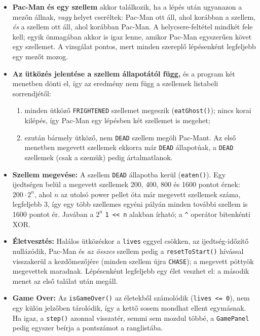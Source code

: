 \documentclass[11pt, a4paper]{article}
\begin{document}
\begin{itemize}
    Az időtartam sosem lesz 0: egy 0 lépéses ijedtség fehérré tenné és megfordítaná a szellemeket, a visszaszámlálás pedig örökre ijedten hagyhatná őket. Egy új power pellet a teljes időtartamot újraindítja.
    \item \textbf{Pac-Man és egy szellem} akkor találkozik, ha a lépés után ugyanazon a mezőn állnak, \textit{vagy} helyet cseréltek: Pac-Man ott áll, ahol korábban a szellem, \textit{és} a szellem ott áll, ahol korábban Pac-Man. A helycsere-feltétel mindkét fele kell; egyik önmagában akkor is igaz lenne, amikor Pac-Man egyszerűen követ egy szellemet. A vizsgálat pontos, mert minden szereplő lépésenként legfeljebb egy mezőt mozog.
    \item \textbf{Az ütközés jelentése a szellem állapotától függ,} és a program két menetben dönti el, így az eredmény nem függ a szellemek listabeli sorrendjétől:
    \begin{enumerate}
        \item minden ütköző \texttt{FRIGHTENED} szellemet megeszik (\texttt{eatGhost()}); nincs korai kilépés, így Pac-Man egy lépésben két szellemet is megehet;
        \item ezután bármely ütköző, nem \texttt{DEAD} szellem megöli Pac-Mant. Az első menetben megevett szellemek ekkorra már \texttt{DEAD} állapotúak, a \texttt{DEAD} szellemek (csak a szemük) pedig ártalmatlanok.
    \end{enumerate}
    \item \textbf{Szellem megevése:} A szellem \texttt{DEAD} állapotba kerül (\texttt{eaten()}). Egy ijedtségen belül a megevett szellemek 200, 400, 800 és 1600 pontot érnek: $200 \cdot 2^n$, ahol $n$ az utolsó power pellet óta már megevett szellemek száma, legfeljebb 3, így egy több szellemes egyéni pályán minden további szellem is 1600 pontot ér. Javában a $2^n$ \texttt{1 << n} alakban írható; a \texttt{\^{}} operátor bitenkénti XOR.
    \item \textbf{Életvesztés:} Halálos ütközéskor a \texttt{lives} eggyel csökken, az ijedtség-időzítő nullázódik, Pac-Man és \textit{az összes} szellem pedig a \texttt{resetToStart()} hívással visszakerül a kezdőmezőjére (minden szellem újra \texttt{CHASE}); a megevett pöttyök megevettek maradnak. Lépésenként legfeljebb egy élet veszhet el: a második menet az első találat után megáll.
    \item \textbf{Game Over:} Az \texttt{isGameOver()} az életekből számolódik (\texttt{lives <= 0}), nem egy külön jelzőben tárolódik, így a kettő sosem mondhat ellent egymásnak. Ha igaz, a \texttt{step()} azonnal visszatér, semmi sem mozdul többé, a \texttt{GamePanel} pedig egyszer beírja a pontszámot a ranglistába.
\end{itemize}
\end{document}
